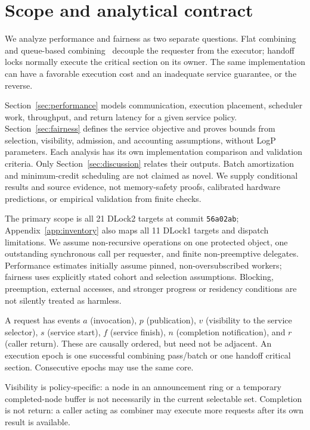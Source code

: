 \section{Scope and analytical contract}
\label{sec:scope}
We analyze performance and fairness as two separate questions.
Flat combining~\cite{fc} and queue-based combining~\cite{cc} decouple the
requester from the executor; handoff locks normally execute the critical
section on its owner. The same implementation can have a favorable execution
cost and an inadequate service guarantee, or the reverse.

Section~\ref{sec:performance} models communication, execution placement,
scheduler work, throughput, and return latency for a given service policy.
Section~\ref{sec:fairness} defines the service objective and proves bounds
from selection, visibility, admission, and accounting assumptions, without
LogP parameters. Each analysis has its own implementation comparison and
validation criteria. Only Section~\ref{sec:discussion} relates their outputs.
Batch amortization and minimum-credit scheduling are not claimed as novel.
We supply conditional results and source evidence, not memory-safety proofs,
calibrated hardware predictions, or empirical validation from finite checks.

The primary scope is all 21 DLock2 targets at commit \texttt{56a02ab};
Appendix~\ref{app:inventory} also maps all 11 DLock1 targets and dispatch
limitations. We assume non-recursive operations on one protected object,
one outstanding synchronous call per requester, and finite non-preemptive
delegates. Performance estimates initially assume pinned, non-oversubscribed
workers; fairness uses explicitly stated cohort and selection assumptions.
Blocking, preemption, external accesses, and stronger progress or residency
conditions are not silently treated as harmless.

\begin{definition}
A request has events $a$ (invocation), $p$ (publication), $v$ (visibility to the
service selector), $s$ (service start), $f$ (service finish), $n$ (completion
notification), and $r$ (caller return). These are causally ordered, but need
not be adjacent. An execution epoch is one successful combining pass/batch
or one handoff critical section. Consecutive epochs may use the same core.
\end{definition}
Visibility is policy-specific: a node in an announcement ring or a temporary
completed-node buffer is not necessarily in the current selectable set.
Completion is not return: a caller acting as combiner may execute more
requests after its own result is available.

